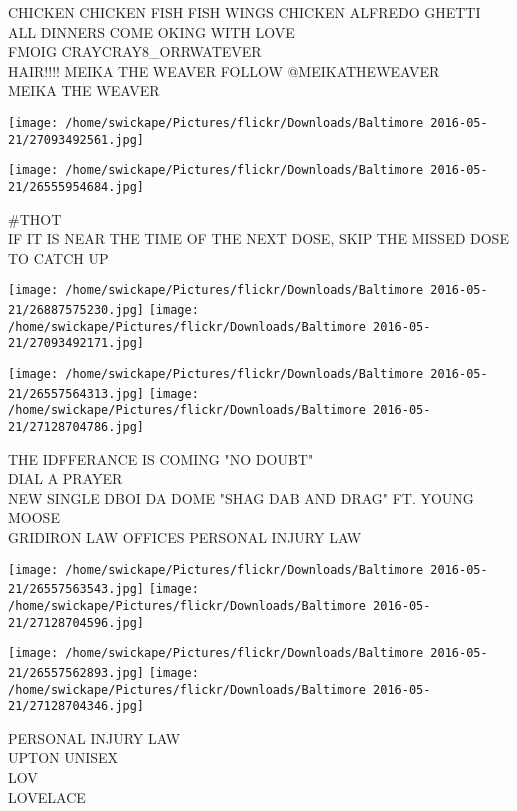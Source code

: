 \documentclass[10pt,letterpaper]{article}
\begin{document}
CHICKEN CHICKEN FISH FISH WINGS CHICKEN ALFREDO GHETTI ALL DINNERS COME OKING WITH LOVE\\
FMOIG CRAYCRAY8\_ORRWATEVER\\
HAIR!!!! MEIKA THE WEAVER FOLLOW @MEIKATHEWEAVER\\
MEIKA THE WEAVER\\
\pagebreak

\texttt{[image: /home/swickape/Pictures/flickr/Downloads/Baltimore 2016-05-21/27093492561.jpg]}

\vspace{0.25in}
\texttt{[image: /home/swickape/Pictures/flickr/Downloads/Baltimore 2016-05-21/26555954684.jpg]}

\#THOT\\
IF IT IS NEAR THE TIME OF THE NEXT DOSE, SKIP THE MISSED DOSE TO CATCH UP\\
\pagebreak

\texttt{[image: /home/swickape/Pictures/flickr/Downloads/Baltimore 2016-05-21/26887575230.jpg]}
\texttt{[image: /home/swickape/Pictures/flickr/Downloads/Baltimore 2016-05-21/27093492171.jpg]}

\texttt{[image: /home/swickape/Pictures/flickr/Downloads/Baltimore 2016-05-21/26557564313.jpg]}
\texttt{[image: /home/swickape/Pictures/flickr/Downloads/Baltimore 2016-05-21/27128704786.jpg]}

THE IDFFERANCE IS COMING "NO DOUBT"\\
DIAL A PRAYER\\
NEW SINGLE DBOI DA DOME "SHAG DAB AND DRAG" FT. YOUNG MOOSE\\
GRIDIRON LAW OFFICES PERSONAL INJURY LAW\\
\pagebreak

\texttt{[image: /home/swickape/Pictures/flickr/Downloads/Baltimore 2016-05-21/26557563543.jpg]}
\texttt{[image: /home/swickape/Pictures/flickr/Downloads/Baltimore 2016-05-21/27128704596.jpg]}

\texttt{[image: /home/swickape/Pictures/flickr/Downloads/Baltimore 2016-05-21/26557562893.jpg]}
\texttt{[image: /home/swickape/Pictures/flickr/Downloads/Baltimore 2016-05-21/27128704346.jpg]}

PERSONAL INJURY LAW\\
UPTON UNISEX\\
LOV\\
LOVELACE\\
\pagebreak
\end{document}
